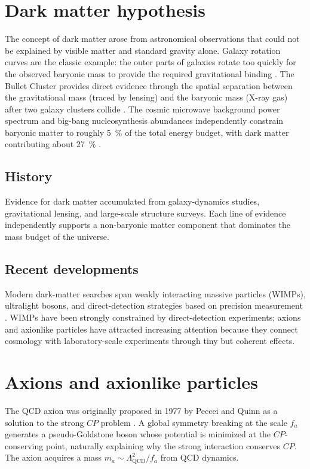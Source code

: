 \section{Dark matter hypothesis}\label{sec:intro:DM}
The concept of dark matter arose from astronomical observations that could not be explained by visible matter and standard gravity alone. Galaxy rotation curves are the classic example: the outer parts of galaxies rotate too quickly for the observed baryonic mass to provide the required gravitational binding \cite{rubin1970rotation,doi:10.1146/annurev.astro.39.1.137}. The Bullet Cluster provides direct evidence through the spatial separation between the gravitational mass (traced by lensing) and the baryonic mass (X-ray gas) after two galaxy clusters collide \cite{Clowe_2006}. The cosmic microwave background power spectrum and big-bang nucleosynthesis abundances independently constrain baryonic matter to roughly \SI{5}{\%} of the total energy budget, with dark matter contributing about \SI{27}{\%} \cite{ade2016planck}.

\subsection{History}
Evidence for dark matter accumulated from galaxy-dynamics studies, gravitational lensing, and large-scale structure surveys. Each line of evidence independently supports a non-baryonic matter component that dominates the mass budget of the universe.

\subsection{Recent developments}
Modern dark-matter searches span weakly interacting massive particles (WIMPs), ultralight bosons, and direct-detection strategies based on precision measurement \cite{Kimball2023_search}. WIMPs have been strongly constrained by direct-detection experiments; axions and axionlike particles have attracted increasing attention because they connect cosmology with laboratory-scale experiments through tiny but coherent effects.

\section{Axions and axionlike particles}\label{sec:intro:axions}
The QCD axion was originally proposed in 1977 by Peccei and Quinn as a solution to the strong $CP$ problem \cite{PecceiQuinn1977_CPConservation_PRL,PecceiQuinn1977_ConstraintsCP_PRD}. A global symmetry breaking at the scale $f_a$ generates a pseudo-Goldstone boson whose potential is minimized at the $CP$-conserving point, naturally explaining why the strong interaction conserves $CP$. The axion acquires a mass $m_a \sim \Lambda_\mathrm{QCD}^2/f_a$ from QCD dynamics.

